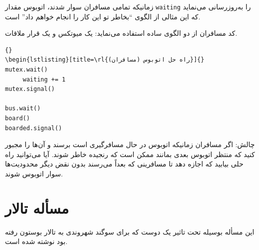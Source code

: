 \documentclass{book}
\newcommand{\clearemptydoublepage}{\newpage\cleardoublepage}
\begin{document}
    زمانیکه تمامی مسافران سوار شدند، اتوبوس مقدار  {\tt waiting} را به‌روزرسانی می‌نماید که این مثالی از الگوی ``بخاطر تو  این کار را انجام خواهم داد'' است. 

    کد مسافران از دو الگوی ساده استفاده می‌نماید: یک میوتکس و یک قرار ملاقات. 

\begin{latin}
\begin{lstlisting}[title={Bus problem solution (riders)}]{}
\begin{lstlisting}[title=\rl{راه حل اتوبوس (مسافران)}]{}
mutex.wait()
     waiting += 1
mutex.signal()

bus.wait()
board()
boarded.signal()
\end{lstlisting}
\end{latin}

    چالش: اگر مسافران زمانیکه اتوبوس در حال مسافرگیری است برسند و آن‌ها را مجبور کنید که منتظر اتوبوس بعدی بمانند ممکن است که رنجیده خاطر شوند. 
    آیا می‌توانید راه حلی بیابید که اجازه دهد تا مسافرینی که بعداً می‌رسند بدون نقض دیگر محدودیت‌ها سوار اتوبوس شوند. 
    


\clearemptydoublepage
\section{مسأله تالار }

    این مسأله بوسیله  تحت تاثیر یک دوست که  برای سوگند شهروندی به تالار   بوستون رفته بود نوشته شده است.
\end{document}
